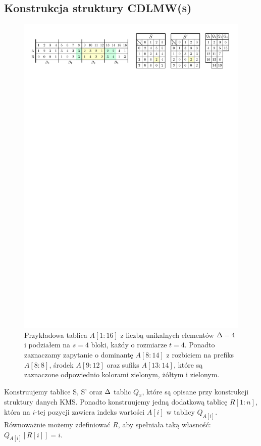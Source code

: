 \subsection{Konstrukcja struktury \textsc{CDLMW(s)}}
\begin{figure}[H]
    \centering
    \includegraphics[scale=0.85]{images/cdlmw.pdf}
    \caption{Przykładowa tablica $A[1:16]$ z liczbą unikalnych elementów $\Delta=4$ i podziałem na $s=4$ bloki, każdy o rozmiarze $t=4$. Ponadto zaznaczamy zapytanie o dominantę $A[8:14]$ z rozbiciem na prefiks $A[8:8]$, środek $A[9:12]$ oraz sufiks $A[13:14]$, które są zaznaczone odpowiednio kolorami zielonym, żółtym i zielonym.}
    \label{fig:cdlmw}
\end{figure}
Konstruujemy tablice S, S' oraz $\Delta$ tablic $Q_x$, które są opisane przy konstrukcji struktury danych KMS. Ponadto konstruujemy jedną dodatkową tablicę $R[1:n]$, która na $i$-tej pozycji zawiera indeks wartości $A[i]$ w tablicy $Q_{A[i]}$. Równoważnie możemy zdefiniować $R$, aby spełniała taką własność: $Q_{A[i]}[R[i]] = i$.

